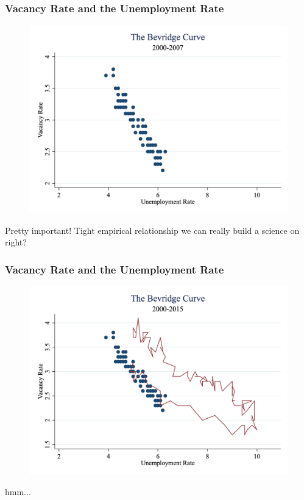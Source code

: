 \documentclass{beamer}
\begin{document}
\begin{frame}
\frametitle[alignment=center]{Vacancy Rate and the Unemployment Rate}
\begin{figure}
\centering
\includegraphics[scale=0.25]{Figures/Beverige_Initial.png}
\end{figure}
Pretty important!  Tight empirical relationship we can really build a science on right?
\end{frame}

\begin{frame}
\frametitle[alignment=center]{Vacancy Rate and the Unemployment Rate}
\begin{figure}
\centering
\includegraphics[scale=0.25]{Figures/Fig_6pt8.png}
\end{figure}
hmm...
\end{frame}
\end{document}
